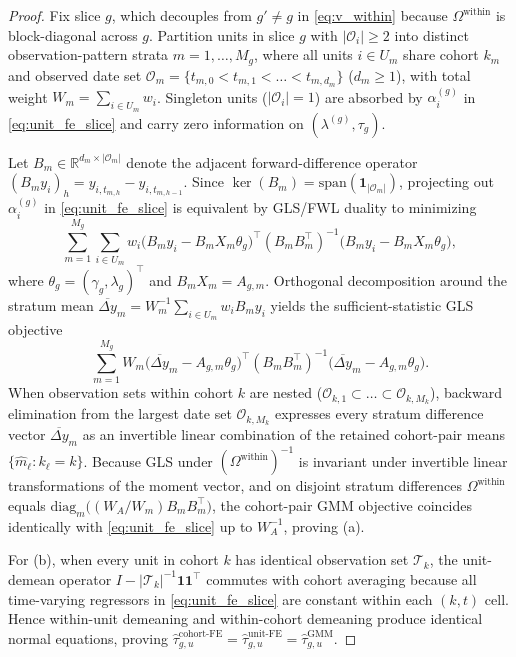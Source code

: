 \documentclass[11pt]{article}
\theoremstyle{definition}
\theoremstyle{remark}
\begin{document}
\begin{proof}
Fix slice $g$, which decouples from $g' \neq g$ in \eqref{eq:v_within} because $\Omega^{\mathrm{within}}$ is block-diagonal across $g$. Partition units in slice $g$ with $|\mathcal{O}_i| \ge 2$ into distinct observation-pattern strata $m = 1,\dots,M_g$, where all units $i \in U_m$ share cohort $k_m$ and observed date set $\mathcal{O}_m = \{t_{m,0} < t_{m,1} < \dots < t_{m, d_m}\}$ ($d_m \ge 1$), with total weight $W_m = \sum_{i \in U_m} w_i$. Singleton units ($|\mathcal{O}_i| = 1$) are absorbed by $\alpha_i^{(g)}$ in \eqref{eq:unit_fe_slice} and carry zero information on $(\lambda^{(g)}, \tau_g)$.

Let $B_m \in \mathbb{R}^{d_m \times |\mathcal{O}_m|}$ denote the adjacent forward-difference operator $(B_m y_i)_h = y_{i, t_{m,h}} - y_{i, t_{m,h-1}}$. Since $\ker(B_m) = \mathrm{span}(\mathbf{1}_{|\mathcal{O}_m|})$, projecting out $\alpha_i^{(g)}$ in \eqref{eq:unit_fe_slice} is equivalent by GLS/FWL duality to minimizing
\[
\sum_{m=1}^{M_g} \sum_{i \in U_m} w_i \bigl(B_m y_i - B_m X_{m} \theta_g\bigr)^\top (B_m B_m^\top)^{-1} \bigl(B_m y_i - B_m X_{m} \theta_g\bigr),
\]
where $\theta_g = (\gamma_g, \lambda_g)^\top$ and $B_m X_m = A_{g,m}$. Orthogonal decomposition around the stratum mean $\overline{\Delta y}_m = W_m^{-1} \sum_{i \in U_m} w_i B_m y_i$ yields the sufficient-statistic GLS objective
\[
\sum_{m=1}^{M_g} W_m \bigl(\overline{\Delta y}_m - A_{g,m} \theta_g\bigr)^\top (B_m B_m^\top)^{-1} \bigl(\overline{\Delta y}_m - A_{g,m} \theta_g\bigr).
\]
When observation sets within cohort $k$ are nested ($\mathcal{O}_{k,1} \subset \dots \subset \mathcal{O}_{k,M_k}$), backward elimination from the largest date set $\mathcal{O}_{k,M_k}$ expresses every stratum difference vector $\overline{\Delta y}_m$ as an invertible linear combination of the retained cohort-pair means $\{\hat{m}_\ell : k_\ell = k\}$. Because GLS under $(\Omega^{\mathrm{within}})^{-1}$ is invariant under invertible linear transformations of the moment vector, and on disjoint stratum differences $\Omega^{\mathrm{within}}$ equals $\mathrm{diag}_m\bigl((W_A/W_m) B_m B_m^\top\bigr)$, the cohort-pair GMM objective coincides identically with \eqref{eq:unit_fe_slice} up to $W_A^{-1}$, proving (a).

For (b), when every unit in cohort $k$ has identical observation set $\mathcal{T}_k$, the unit-demean operator $I - |\mathcal{T}_k|^{-1}\mathbf{1}\mathbf{1}^\top$ commutes with cohort averaging because all time-varying regressors in \eqref{eq:unit_fe_slice} are constant within each $(k, t)$ cell. Hence within-unit demeaning and within-cohort demeaning produce identical normal equations, proving $\hat{\tau}^{\mathrm{cohort\text{-}FE}}_{g,u} = \hat{\tau}^{\mathrm{unit\text{-}FE}}_{g,u} = \hat{\tau}^{\mathrm{GMM}}_{g,u}$.
\end{proof}
\end{document}
